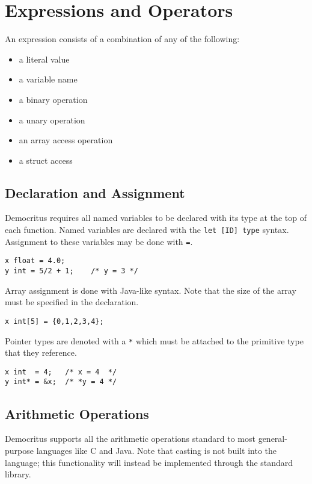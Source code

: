 \section{Expressions and Operators}
	An expression consists of a combination of any of the following:
    \begin{itemize}
        \item a literal value
        \item a variable name
        \item a binary operation
        \item a unary operation
        \item an array access operation
        \item a struct access 
    \end{itemize}
    \subsection{Declaration and Assignment}
    	Democritus requires all named variables to be declared with its type at the top of each function. Named variables are declared with the \texttt{let [ID] type} syntax. Assignment to these variables may be done with \texttt{=}.

		
		\begin{lstlisting}
x float = 4.0;
y int = 5/2 + 1; 	/* y = 3 */
		\end{lstlisting}
		
		\noindent Array assignment is done with Java-like syntax. Note that the size of the array must be specified in the declaration. 
		
		\begin{lstlisting}
x int[5] = {0,1,2,3,4};
		\end{lstlisting}
		
		\noindent Pointer types are denoted with a \texttt{*} which must be attached to the primitive type that they reference.
		
		\begin{lstlisting}
x int  = 4;   /* x = 4  */
y int* = &x;  /* *y = 4 */
		\end{lstlisting}
		
	\subsection{Arithmetic Operations}
		Democritus supports all the arithmetic operations standard to most general-purpose languages like C and Java. Note that casting is not built into the language; this functionality will instead be implemented through the standard library.
		
